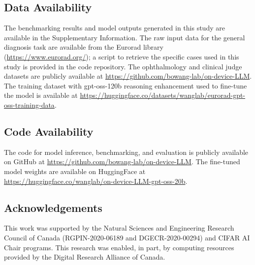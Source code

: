 \documentclass[10pt,journal,compsoc, onecolumn]{IEEEtran}
\begin{document}
\subsection*{Data Availability}
The benchmarking results and model outputs generated in this study are available in the Supplementary Information. The raw input data for the general diagnosis task are available from the Eurorad library (\url{https://www.eurorad.org/}); a script to retrieve the specific cases used in this study is provided in the code repository. The ophthalmology and clinical judge datasets are publicly available at \url{https://github.com/bowang-lab/on-device-LLM}. The training dataset with gpt-oss-120b reasoning enhancement used to fine-tune the model is available at \url{https://huggingface.co/datasets/wanglab/eurorad-gpt-oss-training-data}.

\subsection*{Code Availability}
The code for model inference, benchmarking, and evaluation is publicly available on GitHub at \url{https://github.com/bowang-lab/on-device-LLM}. The fine-tuned model weights are available on HuggingFace at \url{https://huggingface.co/wanglab/on-device-LLM-gpt-oss-20b}.

\subsection*{Acknowledgements} 
This work was supported by the Natural Sciences and Engineering Research Council of Canada (RGPIN-2020-06189 and DGECR-2020-00294) and CIFAR AI Chair programs. This research was enabled, in part, by computing resources provided by the Digital Research Alliance of Canada. 



















\end{document}
